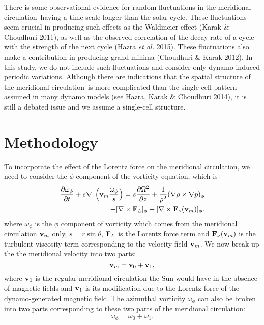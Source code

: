\documentclass{iau}
\def\MC{meridional circulation}
\def\vb{{\bf v}}
\def\Fn{{\bf F}_{\nu}}
\def\FL{{\bf F}_L}
\begin{document}
There is some observational evidence for random fluctuations in the \MC\ having
a time scale longer than the solar cycle.  These fluctuations seem crucial in producing such
effects as the Waldmeier effect (Karak \& Choudhuri 2011), as well as the observed
correlation of the decay rate of a cycle with the strength of the next cycle (Hazra {\em et al.}
2015). These fluctuations also make a contribution in producing grand minima (Choudhuri
\& Karak 2012). In this study, we do not include such fluctuations and consider only
dynamo-induced periodic variations. Although there are indications that the spatial
structure of the \MC\ is more complicated than the single-cell pattern assumed
in many dynamo models (see Hazra, Karak \& Choudhuri 2014), 
it is still a debated issue and we assume a single-cell structure.


\section{Methodology}
To incorporate the effect of the Lorentz force on the meridional circulation, we need to consider the $\phi$ component of the vorticity equation, which is
\begin{eqnarray}
\label{eq:main1}
\frac{\partial \omega_{\phi}}{\partial t} + s \nabla.\left(\vb_m \frac{\omega_{\phi}}{s}\right) =  
s \frac{\partial \Omega^2}{\partial z}+ \frac{1}{\rho^2}(\nabla \rho \times \nabla p)_{\phi} \\ ~~\nonumber
+ [\nabla \times \FL]_{\phi} + [\nabla \times \Fn(\vb_m)]_{\phi}.
\end{eqnarray} 
where $\omega_{\phi}$ is the $\phi$ component of vorticity which comes from the 
meridional circulation $\vb_m$ only, $s = r\sin \theta$, $\FL$ is the Lorentz
force term and $\Fn (\vb_m)$ is the turbulent viscosity term corresponding to the velocity
field $\vb_m$. We now break up the the meridional velocity into two parts:
\begin{equation}\label{eq:v_tot}
 \vb_m = \vb_0 + \vb_1,
\end{equation}
where $\vb_0$ is the regular meridional circulation the Sun would have in the absence of
magnetic fields and $\vb_1$ is its modification
due to the Lorentz force of the dynamo-generated magnetic field. The azimuthal vorticity $\omega_{\phi}$
can also be broken into two parts corresponding to these two parts of the \MC:
\begin{equation}\label{eq:vort}
 \omega_{\phi} = \omega_0 + \omega_1.
\end{equation}
\end{document}
